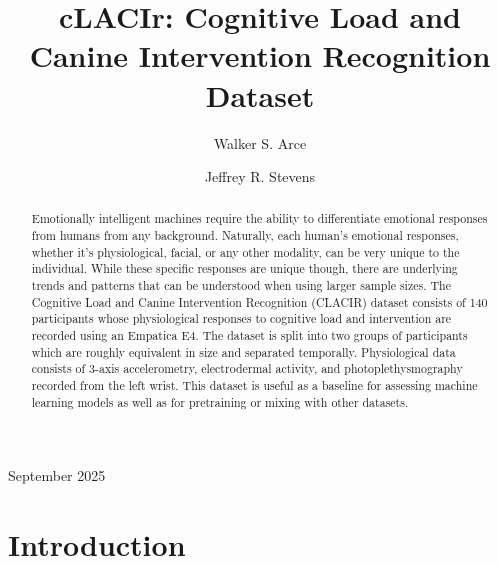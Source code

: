 \documentclass[12pt]{iopart}
\begin{document}
\title[cLACIr: Cognitive Load and Canine Intervention Recognition Dataset]{cLACIr: Cognitive Load and Canine Intervention Recognition Dataset}

\author{Walker S. Arce}
\address{University of Nebraska-Lincoln, Department of Electrical and Computer Engineering, Lincoln, 68588, United States}
\vspace{10pt}

\author{Jeffrey R. Stevens}
\address{University of Nebraska-Lincoln, Department of Psychology, Lincoln, 68588, United States}
\vspace{10pt}
\begin{indented}
\item[]September 2025
\end{indented}

\begin{abstract}
Emotionally intelligent machines require the ability to differentiate emotional responses from humans from any background.  Naturally, each human's emotional responses, whether it's physiological, facial, or any other modality, can be very unique to the individual.  While these specific responses are unique though, there are underlying trends and patterns that can be understood when using larger sample sizes.  The Cognitive Load and Canine Intervention Recognition (CLACIR) dataset consists of 140 participants whose physiological responses to cognitive load and intervention are recorded using an Empatica E4.  The dataset is split into two groups of participants which are roughly equivalent in size and separated temporally.  Physiological data consists of 3-axis accelerometry, electrodermal activity, and photoplethysmography recorded from the left wrist.  This dataset is useful as a baseline for assessing machine learning models as well as for pretraining or mixing with other datasets.
\end{abstract}

%
%
%
% 
%
\section*{Introduction}
\end{document}
